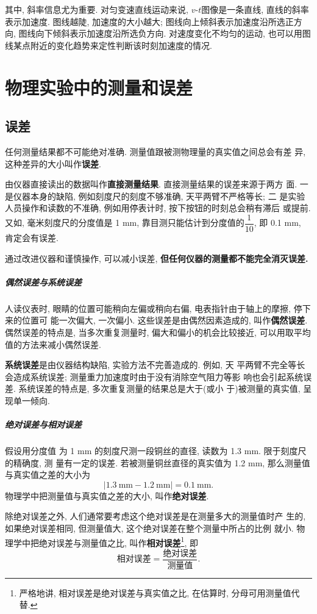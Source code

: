 \documentclass[11pt,a4paper]{ctexbook}
\newcommand{\unit}[1]{\ \mathrm{#1}}
\begin{document}
其中, 斜率信息尤为重要. 对匀变速直线运动来说, $v$-$t$图像是一条直线, 直线的斜率表示加速度. 图线越陡, 加速度的大小越大; 图线向上倾斜表示加速度沿所选正方向, 图线向下倾斜表示加速度沿所选负方向. 对速度变化不均匀的运动, 也可以用图线某点附近的变化趋势来定性判断该时刻加速度的情况.

\section{物理实验中的测量和误差}
\subsection{误差}

任何测量结果都不可能绝对准确. 测量值跟被测物理量的真实值之间总会有差
异, 这种差异的大小叫作\textbf{误差}.

由仪器直接读出的数据叫作\textbf{直接测量结果}. 直接测量结果的误差来源于两方
面. 一是仪器本身的缺陷, 例如刻度尺的刻度不够准确, 天平两臂不严格等长; 二
是实验人员操作和读数的不准确, 例如用停表计时, 按下按钮的时刻总会稍有滞后
或提前. 又如, 毫米刻度尺的分度值是 1 mm, 靠目测只能估计到分度值的$\dfrac{1}{10}$,
即 0.1 mm, 肯定会有误差.

通过改进仪器和谨慎操作, 可以减小误差, \textbf{但任何仪器的测量都不能完全消灭误差.}

\subparagraph{偶然误差与系统误差} 人读仪表时, 眼睛的位置可能稍向左偏或稍向右偏, 电表指针由于轴上的摩擦, 停下来的位置可
能一次偏大, 一次偏小. 这些误差是由偶然因素造成的, 叫作\textbf{偶然误差}.
偶然误差的特点是, 当多次重复测量时, 偏大和偏小的机会比较接近, 可以用取平均值的方法来减小偶然误差.

\textbf{系统误差}是由仪器结构缺陷, 实验方法不完善造成的. 例如, 天
平两臂不完全等长会造成系统误差; 测量重力加速度时由于没有消除空气阻力等影
响也会引起系统误差. 系统误差的特点是, 多次重复测量的结果总是大于(或小
于)被测量的真实值, 呈现单一倾向.

\subparagraph{绝对误差与相对误差} 假设用分度值
为 1 mm 的刻度尺测一段铜丝的直径, 读数为 1.3 mm. 限于刻度尺的精确度, 测
量有一定的误差. 若被测量铜丝直径的真实值为 1.2 mm, 那么测量值与真实值之差的大小为
$$|1.3 \unit{mm} - 1.2 \unit{mm}| =0.1 \unit{mm}.$$
物理学中把测量值与真实值之差的大小, 叫作\textbf{绝对误差}.

除绝对误差之外, 人们通常要考虑这个绝对误差是在测量多大的测量值时产
生的, 如果绝对误差相同, 但测量值大, 这个绝对误差在整个测量中所占的比例
就小. 物理学中把绝对误差与测量值之比, 叫作\textbf{相对误差}\footnote{严格地讲, 相对误差是绝对误差与真实值之比, 在估算时, 分母可用测量值代替.},
即$$\text{相对误差}=\frac{\text{绝对误差}}{\text{测量值}}.$$
\end{document}
